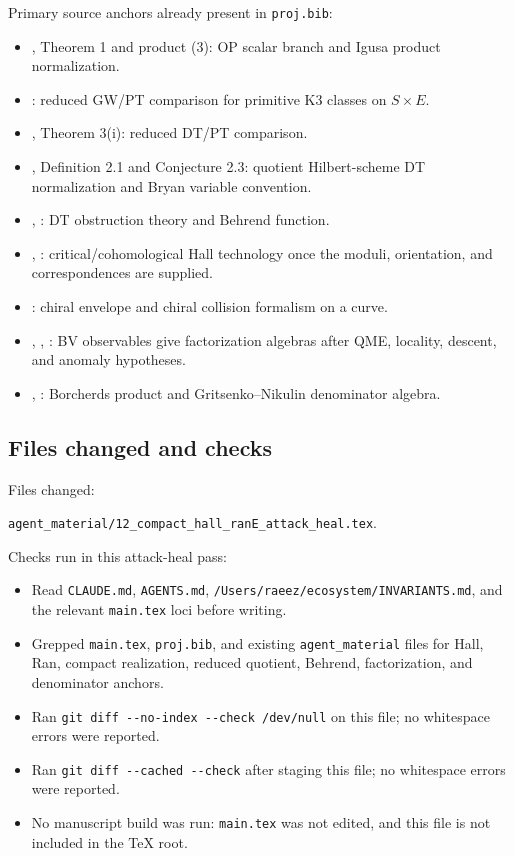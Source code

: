 Primary source anchors already present in \verb|proj.bib|:
\begin{itemize}
\item \cite{OB}, Theorem 1 and product (3): OP scalar branch and Igusa
product normalization.
\item \cite{OPand}: reduced GW/PT comparison for primitive K3 classes on
\(S\times E\).
\item \cite{OberdieckReducedPT}, Theorem 3(i): reduced DT/PT comparison.
\item \cite{BRYAN}, Definition 2.1 and Conjecture 2.3: quotient
Hilbert-scheme DT normalization and Bryan variable convention.
\item \cite{DT}, \cite{BEHREND}: DT obstruction theory and Behrend
function.
\item \cite{KSCoHA}, \cite{DavisonMeinhardtCoHA}: critical/cohomological
Hall technology once the moduli, orientation, and correspondences are
supplied.
\item \cite{BD}: chiral envelope and chiral collision formalism on a
curve.
\item \cite{CostelloRenormalization}, \cite{CostelloGwilliam1},
\cite{CostelloGwilliam2}: BV observables give factorization algebras
after QME, locality, descent, and anomaly hypotheses.
\item \cite{B}, \cite{GN}: Borcherds product and
Gritsenko--Nikulin denominator algebra.
\end{itemize}

\subsection{Files changed and checks}

Files changed:
\begin{center}
\texttt{agent\_material/12\_compact\_hall\_ranE\_attack\_heal.tex}.
\end{center}

Checks run in this attack-heal pass:
\begin{itemize}
\item Read \verb|CLAUDE.md|, \verb|AGENTS.md|,
\verb|/Users/raeez/ecosystem/INVARIANTS.md|, and the relevant
\verb|main.tex| loci before writing.
\item Grepped \verb|main.tex|, \verb|proj.bib|, and existing
\verb|agent_material| files for Hall, Ran, compact realization,
reduced quotient, Behrend, factorization, and denominator anchors.
\item Ran \verb|git diff --no-index --check /dev/null| on this file;
no whitespace errors were reported.
\item Ran \verb|git diff --cached --check| after staging this file; no
whitespace errors were reported.
\item No manuscript build was run: \verb|main.tex| was not edited, and
this file is not included in the TeX root.
\end{itemize}

